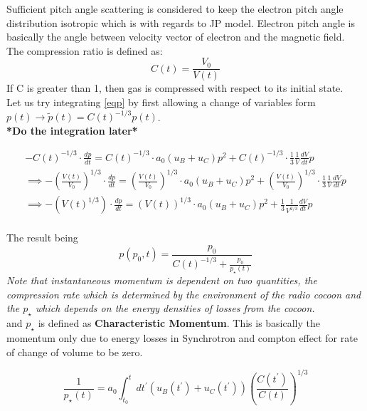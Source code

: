 \documentclass[11pt]{report}
\newcommand{\tbf}[1]{\textbf{#1}}
\newcommand{\tit}[1]{\textit{#1}}
\newcommand{\de}[2]{\frac{d{#1}}{d{#2}}}
\newcommand{\cc}[1]{\left({#1}\right)}
\begin{document}
Sufficient pitch angle scattering is considered to keep the electron pitch angle distribution isotropic which is with regards to JP model. Electron pitch angle is basically the angle between velocity vector of electron and the magnetic field. \\

The compression ratio is defined as:
\begin{equation}
C(t)=\frac{V_0}{V(t)}
\end{equation}
If C is greater than 1, then gas is compressed with respect to its initial state.\\

Let us try integrating \eqref{eqp} by first allowing a change of variables form $p(t)\rightarrow \tilde{p}(t)=C(t)^{-1/3}p(t)$.\\

\tbf{*Do the integration later*}

\begin{eqnarray*}
-C(t)^{-1/3} \cdot \de{p}{t}=C(t)^{-1/3} \cdot a_0(u_B+u_C)p^2 +C(t)^{-1/3} \cdot \frac{1}{3}\frac{1}{V}\de{V}{t}p\\
\implies -\cc{\frac{V(t)}{V_0}}^{1/3} \cdot \de{p}{t}=\cc{\frac{V(t)}{V_0}}^{1/3} \cdot a_0(u_B+u_C)p^2 + \cc{\frac{V(t)}{V_0}}^{1/3}\cdot \frac{1}{3}\frac{1}{V}\de{V}{t}p\\
\implies - \cc{V(t)^{1/3}} \cdot \de{p}{t}=\cc{V(t)}^{1/3} \cdot a_0(u_B+u_C)p^2 +  \frac{1}{3}\frac{1}{V^{2/3}}\de{V}{t}p\\
\end{eqnarray*}

The result being
\begin{equation}\label{eqp2}
p(p_0,t)=\frac{p_0}{C(t)^{-1/3}+\frac{p_0}{p_\star (t)}}
\end{equation}
\tit{Note that instantaneous momentum is dependent on two quantities, the compression rate which is determined by the environment of the radio cocoon and the $p_\star$ which depends on the energy densities of losses from the cocoon.}\\

and $p_\star$ is defined as \tbf{Characteristic Momentum}. This is basically the momentum only due to energy losses in Synchrotron and compton effect for rate of change of volume to be zero.

\begin{equation}\label{eqpstar}
\frac{1}{p_\star(t)}=a_0\int^t _{t_0} dt^\prime \cc{u_B(t^\prime)+u_C(t^\prime)}\cc{\frac{C(t^\prime)}{C(t)}}^{1/3}
\end{equation}
\end{document}
